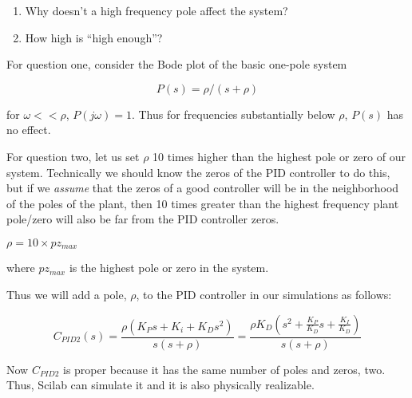 

\begin{enumerate}
  \item Why doesn't a high frequency pole affect the system?
  \item How high is ``high enough''?
\end{enumerate}

 




For question one, consider the Bode plot of the basic one-pole system	%


\[
P(s) = \rho/(s+\rho)
\]

for $\omega << \rho$, $P(j\omega) = 1$.
Thus for frequencies substantially below $\rho$, $P(s)$ has no effect.	%






For question two, let us set $\rho$ 10 times higher than the highest pole or zero of our system.   Technically we should know the zeros of the PID controller to do this, but if we {\it assume} that the zeros of a good controller will be in the neighborhood of the poles of the plant, then 10 times greater than the highest frequency plant pole/zero will also be far from the PID controller zeros.	%

$\rho = 10\times pz_{max}$	%

where $pz_{max}$ is the highest pole or zero in the system.	%

Thus we will add a pole, $\rho$,  to the PID controller in our simulations as follows:	%
 
\[
C_{PID2}(s) = \frac{\rho(K_Ps+K_i + K_Ds^2)}{s(s+\rho)} = \frac{\rho K_D(s^2 + \frac{K_P}{K_D}s + \frac{K_I}{K_D})}{s(s+\rho)}
\]

Now $C_{PID2}$ is proper
because it has the same number of poles and zeros, two.  Thus, Scilab can simulate it and it is also physically realizable.	%








